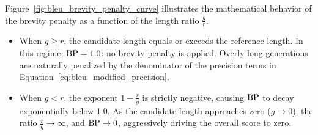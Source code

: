 \documentclass[../../../main.tex]{subfiles}
\begin{document}
Figure~\ref{fig:bleu_brevity_penalty_curve} illustrates the mathematical behavior of the brevity penalty as a function of the length ratio $\frac{g}{r}$.
\begin{itemize}
    \item When $g \ge r$, the candidate length equals or exceeds the reference length. In this regime, $\mathrm{BP} = 1.0$: no brevity penalty is applied. Overly long generations are naturally penalized by the denominator of the precision terms in Equation~\eqref{eq:bleu_modified_precision}.
    \item When $g < r$, the exponent $1 - \frac{r}{g}$ is strictly negative, causing $\mathrm{BP}$ to decay exponentially below 1.0. As the candidate length approaches zero ($g \to 0$), the ratio $\frac{r}{g} \to \infty$, and $\mathrm{BP} \to 0$, aggressively driving the overall score to zero.
\end{itemize}
\end{document}
